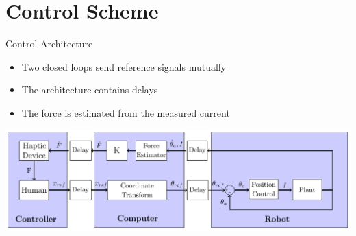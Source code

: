 \section{Control Scheme}

\begin{frame}{Control Architecture}{}
  \begin{itemize}
    \item Two closed loops send reference signals mutually
    \item The architecture contains delays
    \item The force is estimated from the measured current
    \end{itemize}
    \vspace{25mm}
    \includegraphics[width=\textwidth]{Billeder/Dan/control.pdf}
\end{frame}
